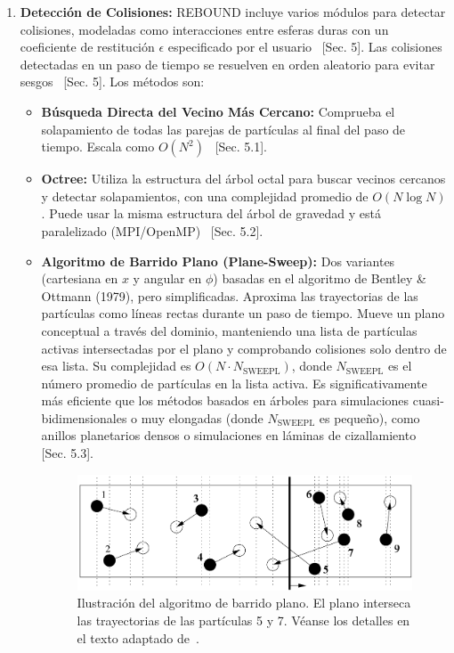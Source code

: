 \begin{enumerate}
    \item \textbf{Detección de Colisiones:} REBOUND incluye varios módulos para detectar colisiones, modeladas como interacciones entre esferas duras con un coeficiente de restitución $\epsilon$ especificado por el usuario~\cite{Rein2012} [Sec. 5]. Las colisiones detectadas en un paso de tiempo se resuelven en orden aleatorio para evitar sesgos~\cite{Rein2012} [Sec. 5]. Los métodos son:
    \begin{itemize}
        \item \textbf{Búsqueda Directa del Vecino Más Cercano:} Comprueba el solapamiento de todas las parejas de partículas al final del paso de tiempo. Escala como $O(N^2)$~\cite{Rein2012} [Sec. 5.1].
        \item \textbf{Octree:} Utiliza la estructura del árbol octal para buscar vecinos cercanos y detectar solapamientos, con una complejidad promedio de $O(N \log N)$. Puede usar la misma estructura del árbol de gravedad y está paralelizado (MPI/OpenMP)~\cite{Rein2012} [Sec. 5.2].
        \item \textbf{Algoritmo de Barrido Plano (Plane-Sweep):} Dos variantes (cartesiana en $x$ y angular en $\phi$) basadas en el algoritmo de Bentley \& Ottmann (1979), pero simplificadas. Aproxima las trayectorias de las partículas como líneas rectas durante un paso de tiempo. Mueve un plano conceptual a través del dominio, manteniendo una lista de partículas activas intersectadas por el plano y comprobando colisiones solo dentro de esa lista. Su complejidad es $O(N \cdot N_{\text{SWEEPL}})$, donde $N_{\text{SWEEPL}}$ es el número promedio de partículas en la lista activa. Es significativamente más eficiente que los métodos basados en árboles para simulaciones cuasi-bidimensionales o muy elongadas (donde $N_{\text{SWEEPL}}$ es pequeño), como anillos planetarios densos o simulaciones en láminas de cizallamiento~\cite{Rein2012} [Sec. 5.3].
        \begin{figure}[H]
            \centering
            \includegraphics[width=\textwidth]{img/marcoTeorico/Algoritmo_de_barrido_plano.png}
            \caption{Ilustración del algoritmo de barrido plano. El plano interseca las trayectorias de las partículas 5 y 7. Véanse los detalles en el texto adaptado de~\cite{Rein2012}.}%
            \label{fig:plane_sweep_algorithm}
        \end{figure}
    \end{itemize}


\end{enumerate}
